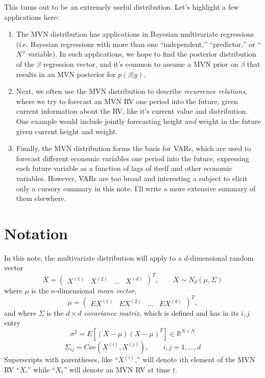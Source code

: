 \documentclass[a4paper,12pt]{scrartcl}
\begin{document}
This turns out to be an extremely useful distribution. Let's highlight
a few applications here: 
\begin{enumerate}
    \item The MVN distribution has applications in Bayesian multivariate 
	regressions (i.e. Bayesian regressions with more than one 
	``independent,'' ``predictor,'' or ``$X$'' variable). 
	In such applications, we hope to find the posterior distribution
	of the $\beta$ regression vector, and it's common to assume
	a MVN prior on $\beta$ that results in an MVN posterior for
	$p(\beta|y)$.
    \item Next, we often use the MVN distribution to describe
	\emph{recurrence relations}, where we try to 
	forecast an MVN RV one period into the future, given
	current information about the RV, like it's current value
	and distribution. One example would include jointly forecasting 
	height \emph{and} weight in the future given current height
	and weight.
    \item Finally, the MVN distribution forms the basis for 
	VARs, which are used to forecast different economic variables 
	one period into the future, expressing each future variable
	as a function of lags of itself and other economic variables.
	However, VARs are too broad and interesting a subject to 
	elicit only a cursory summary in this note.  I'll write
	a more extensive summary of them elsewhere.
\end{enumerate}


\tableofcontents

\vskip 1in

\section{Notation}

In this note, the multivariate distribution will apply to a
$d$-dimensional random vector 
\[ X = \begin{pmatrix} X^{(1)} & X^{(2)} & \ldots & X^{(d)} \end{pmatrix}^T,
    \qquad X  \sim N_d(\mu, \Sigma) \]
where $\mu$ is the $n$-dimensional \emph{mean vector},
\[ \mu = \begin{pmatrix} EX^{(1)} & EX^{(2)} & \ldots & EX^{(d)} \end{pmatrix}^T,
      \]
and where $\Sigma$ is the $d\times d$ \emph{covariance matrix}, which
is defined and has in its $i,j$ entry
\[ \sigma^2 = E\left[ (X - \mu) (X-\mu)^T\right] \in
   \mathbb{R}^{N\times N} \] 
\[ \Sigma_{ij} = Cov(X^{(i)}, X^{(j)}), \qquad i,j = 1, \ldots, d\]
Superscripts with parentheses, like ``$X^{(i)}$,'' will denote
$i$th element of the MVN RV ``$X$,'' while ``$X_t$'' will denote
an MVN RV at time $t$.
\end{document}
